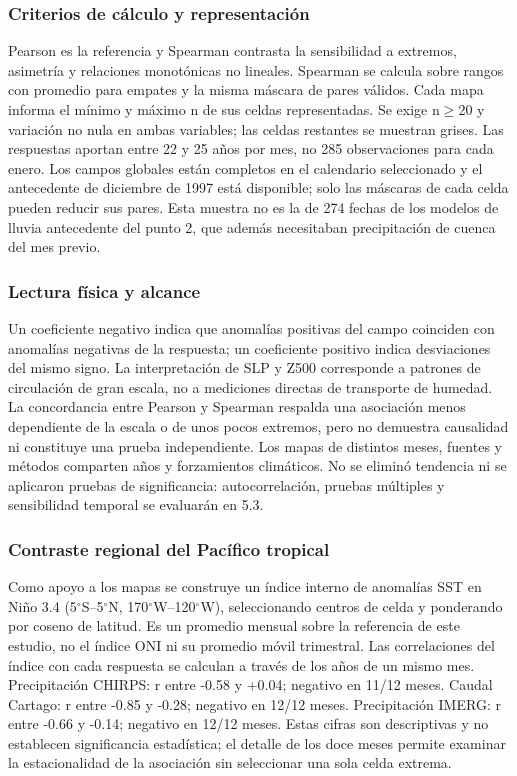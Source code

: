 \documentclass[10pt,a4paper]{article}
\begin{document}
\subsubsection*{Criterios de cálculo y representación}
Pearson es la referencia y Spearman contrasta la sensibilidad a extremos, asimetría y relaciones monotónicas no lineales. Spearman se calcula sobre rangos con promedio para empates y la misma máscara de pares válidos. Cada mapa informa el mínimo y máximo n de sus celdas representadas. Se exige n$\geq$20 y variación no nula en ambas variables; las celdas restantes se muestran grises. Las respuestas aportan entre 22 y 25 años por mes, no 285 observaciones para cada enero. Los campos globales están completos en el calendario seleccionado y el antecedente de diciembre de 1997 está disponible; solo las máscaras de cada celda pueden reducir sus pares. Esta muestra no es la de 274 fechas de los modelos de lluvia antecedente del punto 2, que además necesitaban precipitación de cuenca del mes previo.

\subsubsection*{Lectura física y alcance}
Un coeficiente negativo indica que anomalías positivas del campo coinciden con anomalías negativas de la respuesta; un coeficiente positivo indica desviaciones del mismo signo. La interpretación de SLP y Z500 corresponde a patrones de circulación de gran escala, no a mediciones directas de transporte de humedad. La concordancia entre Pearson y Spearman respalda una asociación menos dependiente de la escala o de unos pocos extremos, pero no demuestra causalidad ni constituye una prueba independiente. Los mapas de distintos meses, fuentes y métodos comparten años y forzamientos climáticos. No se eliminó tendencia ni se aplicaron pruebas de significancia: autocorrelación, pruebas múltiples y sensibilidad temporal se evaluarán en 5.3.

\subsubsection*{Contraste regional del Pacífico tropical}
Como apoyo a los mapas se construye un índice interno de anomalías SST en Niño 3.4 (5$^\circ$S–5$^\circ$N, 170$^\circ$W–120$^\circ$W), seleccionando centros de celda y ponderando por coseno de latitud. Es un promedio mensual sobre la referencia de este estudio, no el índice ONI ni su promedio móvil trimestral. Las correlaciones del índice con cada respuesta se calculan a través de los años de un mismo mes. Precipitación CHIRPS: r entre -0.58 y +0.04; negativo en 11/12 meses. Caudal Cartago: r entre -0.85 y -0.28; negativo en 12/12 meses. Precipitación IMERG: r entre -0.66 y -0.14; negativo en 12/12 meses. Estas cifras son descriptivas y no establecen significancia estadística; el detalle de los doce meses permite examinar la estacionalidad de la asociación sin seleccionar una sola celda extrema.
\end{document}
